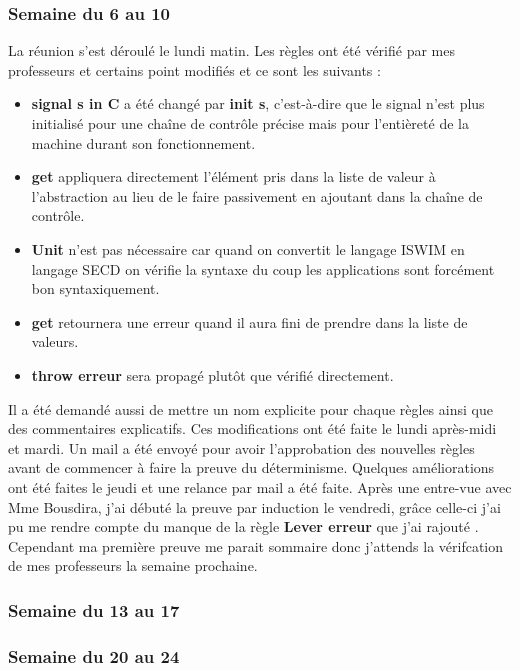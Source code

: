 \documentclass[10pt,a4paper]{article}
\begin{document}
		\subsubsection{Semaine du 6 au 10}
		
		La réunion s'est déroulé le lundi matin. Les règles ont été vérifié par mes professeurs et certains point modifiés et ce sont les suivants :
		\begin{itemize}
			\item \textbf{signal s in C} a été changé par \textbf{init s}, c'est-à-dire que le signal n'est plus initialisé pour une chaîne de contrôle précise mais pour l'entièreté de la machine durant son fonctionnement.
			\item \textbf{get} appliquera directement l'élément pris dans la liste de valeur à l'abstraction au lieu de le faire passivement en ajoutant dans la chaîne de contrôle.
			\item \textbf{Unit} n'est pas nécessaire car quand on convertit le langage ISWIM en langage SECD on vérifie la syntaxe du coup les applications sont forcément bon syntaxiquement.
			\item \textbf{get} retournera une erreur quand il aura fini de prendre dans la liste de valeurs.
			\item \textbf{throw erreur} sera propagé plutôt que vérifié directement.
		\end{itemize}
		\medbreak
		Il a été demandé aussi de mettre un nom explicite pour chaque règles ainsi que des commentaires explicatifs. 
		\smallbreak
		Ces modifications ont été faite le lundi après-midi et mardi. Un mail a été envoyé pour avoir l'approbation des nouvelles règles avant de commencer à faire la preuve du déterminisme. Quelques améliorations ont été faites le jeudi et une relance par mail a été faite.
		\medbreak
		Après une entre-vue avec Mme Bousdira, j'ai débuté la preuve par induction le vendredi, grâce celle-ci j'ai pu me rendre compte du manque de la règle \textbf{Lever erreur} que j'ai rajouté . Cependant ma première preuve me parait sommaire donc j'attends la vérifcation de mes professeurs la semaine prochaine. 
		
		\subsubsection{Semaine du 13 au 17}
		
		\subsubsection{Semaine du 20 au 24}
\end{document}
